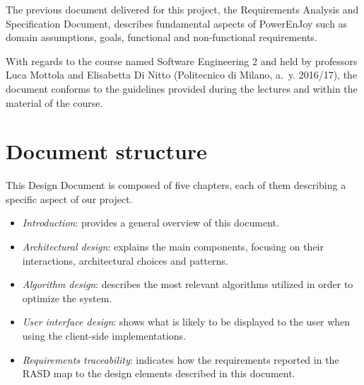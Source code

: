The previous document delivered for this project, the Requirements Analysis and Specification Document, describes fundamental aspects of PowerEnJoy such as domain assumptions, goals, functional and non-functional requirements.

With regards to the course named Software Engineering 2 and held by professors Luca Mottola and Elisabetta Di Nitto (Politecnico di Milano, a.~y. 2016/17), the document conforms to the guidelines provided during the lectures and within the material of the course.

\section{Document structure}
This Design Document is composed of five chapters, each of them describing a specific aspect of our project.
\begin{itemize}
	\item \emph{Introduction}: provides a general overview of this document.
	\item \emph{Architectural design}: explains the main components, focusing on their interactions, architectural choices and patterns.
	\item \emph{Algorithm design}: describes the most relevant algorithms utilized in order to optimize the system.
	\item \emph{User interface design}: shows what is likely to be displayed to the user when using the client-side implementations.
	\item \emph{Requirements traceability}: indicates how the requirements reported in the RASD map to the design elements described in this document.
\end{itemize}
